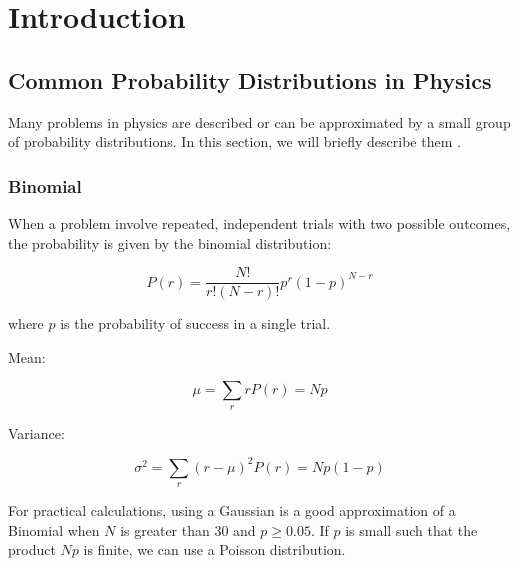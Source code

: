 \chapter{Introduction}




\section{Common Probability Distributions in Physics}
\label{distributions1}

Many problems in physics are described or can be approximated by a small group of probability distributions. In this section, we will briefly describe them \cite{leo2012techniques}.

\subsection{Binomial}

When a problem involve repeated, independent trials with two possible outcomes, the probability is given by the binomial distribution:

\begin{equation}
	P(r)= \frac{N! }{ r! \left( N-r \right)! } p^r (1-p)^{N-r}
\end{equation}

where $p$ is the probability of success in a single trial.

Mean:

\begin{equation}
	\mu = \sum_{r}rP(r) = Np
\end{equation}

Variance:

\begin{equation}
	\sigma^2=\sum_r(r-\mu)^2P(r) = Np(1-p)
\end{equation}

For practical calculations, using a Gaussian is a good approximation of a Binomial when $N$ is greater than 30 and $p\geq0.05$. If $p$ is small such that the product $Np$ is finite, we can use a Poisson distribution.


